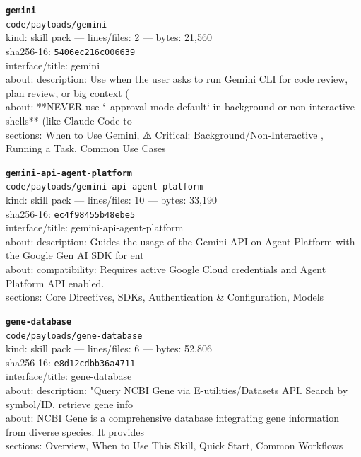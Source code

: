 \noindent\textbf{\texttt{gemini}}\\
\texttt{code/payloads/gemini}\\
kind: skill pack --- lines/files: 2 --- bytes: 21,560\\
sha256-16: \texttt{5406ec216c006639}\\
interface/title: gemini\\
about: description: Use when the user asks to run Gemini CLI for code review, plan review, or big context (\\
about: **NEVER use `--approval-mode default` in background or non-interactive shells** (like Claude Code to\\
sections: When to Use Gemini, ⚠️ Critical: Background/Non-Interactive , Running a Task, Common Use Cases\\
\vspace*{6.0pt}

\noindent\textbf{\texttt{gemini-api-agent-platform}}\\
\texttt{code/payloads/gemini-api-agent-platform}\\
kind: skill pack --- lines/files: 10 --- bytes: 33,190\\
sha256-16: \texttt{ec4f98455b48ebe5}\\
interface/title: gemini-api-agent-platform\\
about: description: Guides the usage of the Gemini API on Agent Platform with the Google Gen AI SDK for ent\\
about: compatibility: Requires active Google Cloud credentials and Agent Platform API enabled.\\
sections: Core Directives, SDKs, Authentication \& Configuration, Models\\
\vspace*{6.0pt}

\noindent\textbf{\texttt{gene-database}}\\
\texttt{code/payloads/gene-database}\\
kind: skill pack --- lines/files: 6 --- bytes: 52,806\\
sha256-16: \texttt{e8d12cdbb36a4711}\\
interface/title: gene-database\\
about: description: "Query NCBI Gene via E-utilities/Datasets API. Search by symbol/ID, retrieve gene info \\
about: NCBI Gene is a comprehensive database integrating gene information from diverse species. It provides\\
sections: Overview, When to Use This Skill, Quick Start, Common Workflows\\
\vspace*{6.0pt}

